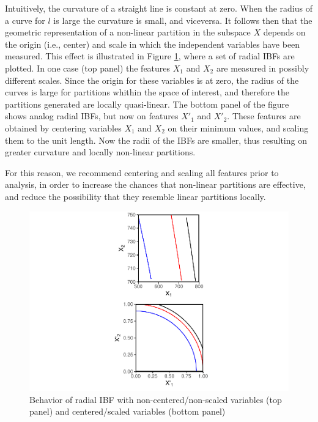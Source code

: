 \documentclass[]{elsarticle} %
\makeatletter
\def\maxwidth{\ifdim\Gin@nat@width>\linewidth\linewidth
\else\Gin@nat@width\fi}
\let\Oldincludegraphics\includegraphics
\renewcommand{\includegraphics}[1]{\Oldincludegraphics[width=\maxwidth]{#1}}
\makeatother
\begin{document}
Intuitively, the curvature of a straight line is constant at zero. When
the radius of a curve for \(l\) is large the curvature is small, and
viceversa. It follows then that the geometric representation of a
non-linear partition in the subspace \(X\) depends on the origin (i.e.,
center) and scale in which the independent variables have been measured.
This effect is illustrated in Figure \ref{fig:fig7-curvature}, where a
set of radial IBFs are plotted. In one case (top panel) the features
\(X_1\) and \(X_2\) are measured in possibly different scales. Since the
origin for these variables is at zero, the radius of the curves is large
for partitions whithin the space of interest, and therefore the
partitions generated are locally quasi-linear. The bottom panel of the
figure shows analog radial IBFs, but now on features \(X'_1\) and
\(X'_2\). These features are obtained by centering variables \(X_1\) and
\(X_2\) on their minimum values, and scaling them to the unit length.
Now the radii of the IBFs are smaller, thus resulting on greater
curvature and locally non-linear partitions.

For this reason, we recommend centering and scaling all features prior
to analysis, in order to increase the chances that non-linear partitions
are effective, and reduce the possibility that they resemble linear
partitions locally.

\begin{figure}
\centering
\includegraphics{Trees_with_Base_Functions_v3_files/figure-latex/fig7-curvature-1.pdf}
\caption{\label{fig:fig7-curvature}Behavior of radial IBF with
non-centered/non-scaled variables (top panel) and centered/scaled
variables (bottom panel)}
\end{figure}
\end{document}
